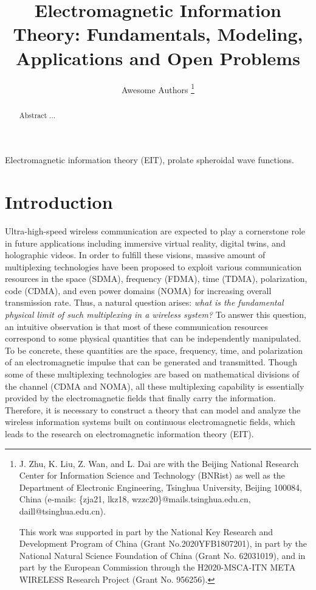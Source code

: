 \documentclass[journal,twocolumn]{IEEEtran}
\begin{document}
\title{Electromagnetic Information Theory: Fundamentals, Modeling, Applications and Open Problems}

\author{{Awesome Authors}
\thanks{J. Zhu, K. Liu, Z. Wan, and L. Dai are with the Beijing National Research Center for Information Science and Technology (BNRist) as well as the Department of Electronic Engineering, Tsinghua University, Beijing 100084, China (e-mails: \{zja21, lkz18, wzzc20\}@mails.tsinghua.edu.cn, daill@tsinghua.edu.cn).


This work was supported in part by the National Key Research and Development Program of China (Grant No.2020YFB1807201), in part by the National Natural Science Foundation of China (Grant No. 62031019), and in part by the European Commission through the H2020-MSCA-ITN META WIRELESS Research Project (Grant No. 956256).}
}

\maketitle

\begin{abstract}
    Abstract ...
\end{abstract}

\begin{IEEEkeywords}
    Electromagnetic information theory (EIT), prolate spheroidal wave functions. 
\end{IEEEkeywords}

\section{Introduction}
Ultra-high-speed wireless communication are expected to play a cornerstone role in future applications including immersive virtual reality, digital twins, and holographic videos. 
In order to fulfill these visions, massive amount of multiplexing technologies have been proposed to exploit various communication resources in the space (SDMA), frequency (FDMA), time (TDMA), polarization, code (CDMA), and even power domains (NOMA) for increasing overall transmission rate. 
Thus, a natural question arises: {\it what is the fundamental physical limit of such multiplexing in a wireless system?}
To answer this question, an intuitive observation is that most of these communication resources correspond to some physical quantities that can be independently manipulated. To be concrete, these quantities are the space, frequency, time, and polarization of an electromagnetic impulse that can be generated and transmitted. Though some of these multiplexing technologies are based on mathematical divisions of the channel (CDMA and NOMA), all these multiplexing capability is essentially provided by the electromagnetic fields that finally carry the information. Therefore, it is necessary to construct a theory that can model and analyze the wireless information systems built on continuous electromagnetic fields, which leads to the research on electromagnetic information theory (EIT).
\end{document}
